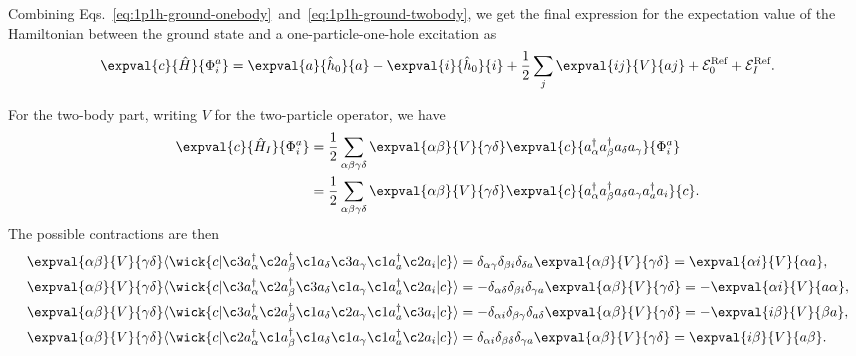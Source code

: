 Combining Eqs.~\eqref{eq:1p1h-ground-onebody}~and~\eqref{eq:1p1h-ground-twobody}, we get the final expression for the expectation value of the Hamiltonian between the ground state and a one-particle-one-hole excitation as
\begin{equation}\label{eq:1p1h-ground}
    \expval{c}{\hat{H}}{\Phi_i^a} = \expval{a}{\hat{h}_0}{a} - \expval{i}{\hat{h}_0}{i} + \frac{1}{2} \sum_{j} \expval{i j}{V}{a j} + \mathcal{E}_0^{\text{Ref}} + \mathcal{E}_I^{\text{Ref}}.
\end{equation}

\newpage

For the two-body part, writing $V$ for the two-particle operator, we have
\begin{align*}
    \expval{c}{\hat{H}_I}{\Phi_i^a} &= \frac{1}{2} \sum_{\alpha\beta\gamma\delta} \expval{\alpha\beta}{V}{\gamma\delta} \expval{c}{a_\alpha^\dagger a_\beta^\dagger a_\delta a_\gamma}{\Phi_i^a} \\
    &= \frac{1}{2} \sum_{\alpha\beta\gamma\delta} \expval{\alpha\beta}{V}{\gamma\delta} \expval{c}{a_\alpha^\dagger a_\beta^\dagger a_\delta a_\gamma a_a^\dagger a_i}{c}.
\end{align*}
The possible contractions are then
\begin{align*}
    \expval{\alpha\beta}{V}{\gamma\delta} \langle
    \wick{
        c
        \vert
        \c3 a_\alpha^\dagger \c2 a_\beta^\dagger \c1 a_\delta \c3 a_\gamma \c1 a_a^\dagger \c2 a_i
        \vert
        c
    }
    \rangle
    &= \delta_{\alpha \gamma} \delta_{\beta i} \delta_{\delta a} \expval{\alpha\beta}{V}{\gamma\delta}
    = \expval{\alpha i}{V}{\alpha a}, \\
    \expval{\alpha\beta}{V}{\gamma\delta} \langle
    \wick{
        c
        \vert
        \c3 a_\alpha^\dagger \c2 a_\beta^\dagger \c3 a_\delta \c1 a_\gamma \c1 a_a^\dagger \c2 a_i
        \vert
        c
    }
    \rangle
    &= -\delta_{\alpha \delta} \delta_{\beta i} \delta_{\gamma a} \expval{\alpha\beta}{V}{\gamma\delta} = -\expval{\alpha i}{V}{a \alpha}, \\
    \expval{\alpha\beta}{V}{\gamma\delta} \langle
    \wick{
        c
        \vert
        \c3 a_\alpha^\dagger \c2 a_\beta^\dagger \c1 a_\delta \c2 a_\gamma \c1 a_a^\dagger \c3 a_i
        \vert
        c
    }
    \rangle
    &= -\delta_{\alpha i} \delta_{\beta \gamma} \delta_{a \delta} \expval{\alpha\beta}{V}{\gamma\delta} = -\expval{i \beta}{V}{\beta a}, \\
    \expval{\alpha\beta}{V}{\gamma\delta} \langle
    \wick{
        c
        \vert
        \c2 a_\alpha^\dagger \c1 a_\beta^\dagger \c1 a_\delta \c1 a_\gamma \c1 a_a^\dagger \c2 a_i
        \vert
        c
    }
    \rangle
    &= \delta_{\alpha i} \delta_{\beta \delta} \delta_{\gamma a} \expval{\alpha\beta}{V}{\gamma\delta} = \expval{i \beta}{V}{a \beta}.
\end{align*}
